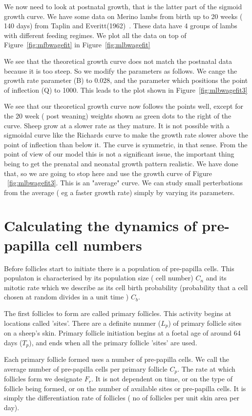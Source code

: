 \documentclass[titlepage]{article}  %
\begin{document}
We now need to look at postnatal growth, that is the latter part of the sigmoid growth curve. We have some data on Merino lambs from birth up to 20 weeks ( 140 days) from Taplin and Everitt(1962)~\cite{tapl:62}. These  data have 4 groups of lambs with different feeding regimes. We plot all the data on top of Figure~\ref{fig:mfbwagefit} in Figure~\ref{fig:mlbwagefit}

We see that the theoretical growth curve does not match the postnatal data because it is too steep. So we modify the parameters as follows. We cange the growth rate parameter (B) to 0.028, and the parameter which positions the point of inflection (Q) to 1000. This leads to the plot shown in Figure~\ref{fig:mlbwagefit3}

We see that our theoretical growth curve now follows the points well, except for the 20 week ( post weaning) weights shown as green dots to the right of the curve. Sheep grow at a slower rate as they mature. It is not possible with a sigmoidal curve like the Richards curve to make the growth rate slower above the point of inflection than below it. The curve is symmetric, in that sense. From the point of view of our model this is not a significant issue, the important thing being to get the prenatal and neonatal growth pattern realistic. We have done that, so we are going to stop here and use the growth curve of Figure ~\ref{fig:mlbwagefit3}.  This is an "average" curve. We can study small perterbations from the average ( eg a faster growth rate) simply by varying its parameters.

\section{Calculating the dynamics of pre-papilla cell numbers}
\label{sec:calc}
 Before follicles start to initiate there is a population of pre-papilla cells. This populaton is characterised by its population size ( cell number) $C_{n}$
and its mitotic rate which we describe as its cell birth probability (probability that a cell chosen at random divides in a unit time ) $C_{b}$.

 The first follicles to form are called primary follicles. This activity begins at locations called 'sites'. There are a definite nunmer ($L_{p}$) of primary follicle sites on a sheep's skin. Primary follicle initiation begins at a foetal age of around 64 days ($T_{p}$), and ends when all the primary follicle 'sites' are used.

Each primary follicle formed uses a number of pre-papilla cells. We call the average number of pre-papilla cells per primary follicle $C_{p}$. The rate at which follicles form we designate $F_{r}$. It is not dependent on time, or on the type of follicle being formed, or on the number of available sites or pre-papilla cells. It is simply the differentiation rate of follicles ( no of follicles per unit skin area per day). 
\end{document}
